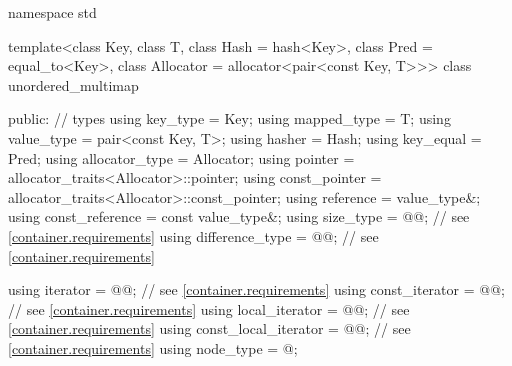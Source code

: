 %
\begin{codeblock}
namespace std {
  template<class Key,
           class T,
           class Hash = hash<Key>,
           class Pred = equal_to<Key>,
           class Allocator = allocator<pair<const Key, T>>>
  class unordered_multimap {
  public:
    // types
    using key_type             = Key;
    using mapped_type          = T;
    using value_type           = pair<const Key, T>;
    using hasher               = Hash;
    using key_equal            = Pred;
    using allocator_type       = Allocator;
    using pointer              = allocator_traits<Allocator>::pointer;
    using const_pointer        = allocator_traits<Allocator>::const_pointer;
    using reference            = value_type&;
    using const_reference      = const value_type&;
    using size_type            = @@; // see \ref{container.requirements}
    using difference_type      = @@; // see \ref{container.requirements}

    using iterator             = @@; // see \ref{container.requirements}
    using const_iterator       = @@; // see \ref{container.requirements}
    using local_iterator       = @@; // see \ref{container.requirements}
    using const_local_iterator = @@; // see \ref{container.requirements}
    using node_type            = @\unspec@;

}}
\end{codeblock}
